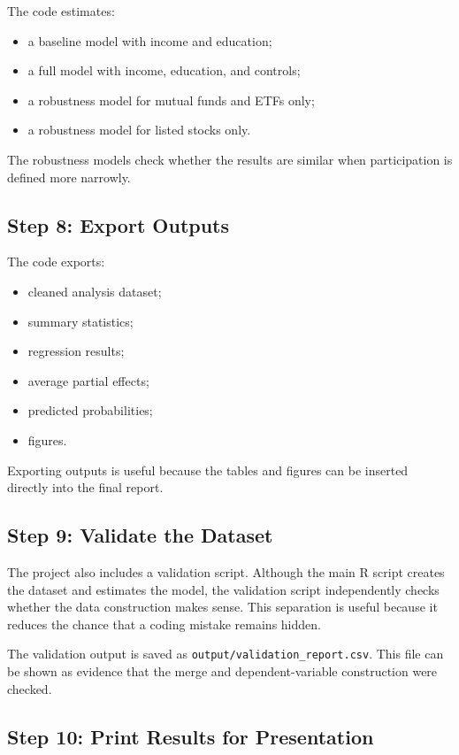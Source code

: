 \documentclass[12pt]{article}
\begin{document}
The code estimates:

\begin{itemize}[leftmargin=*]
    \item a baseline model with income and education;
    \item a full model with income, education, and controls;
    \item a robustness model for mutual funds and ETFs only;
    \item a robustness model for listed stocks only.
\end{itemize}

The robustness models check whether the results are similar when participation is defined more narrowly.

\subsection{Step 8: Export Outputs}

The code exports:

\begin{itemize}[leftmargin=*]
    \item cleaned analysis dataset;
    \item summary statistics;
    \item regression results;
    \item average partial effects;
    \item predicted probabilities;
    \item figures.
\end{itemize}

Exporting outputs is useful because the tables and figures can be inserted directly into the final report.

\subsection{Step 9: Validate the Dataset}

The project also includes a validation script. Although the main R script creates the dataset and estimates the model, the validation script independently checks whether the data construction makes sense. This separation is useful because it reduces the chance that a coding mistake remains hidden.

The validation output is saved as \texttt{output/validation\_report.csv}. This file can be shown as evidence that the merge and dependent-variable construction were checked.

\subsection{Step 10: Print Results for Presentation}
\end{document}
